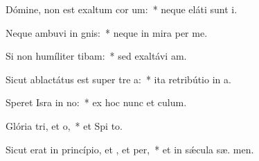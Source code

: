 \item Dómine, non est exaltum cor um:~* neque eláti sunt  i.
\item Neque ambuvi in gnis:~* neque in mira per me.
\item Si non humíliter tibam:~* sed exaltávi  am.
\item Sicut ablactátus est super tre a:~* ita retribútio in  a.
\item Speret Isra in no:~* ex hoc nunc et   culum.
\item Glória tri, et o,~* et Spi to.
\item Sicut erat in princípio, et , et per,~* et in sǽcula sæ. men.
